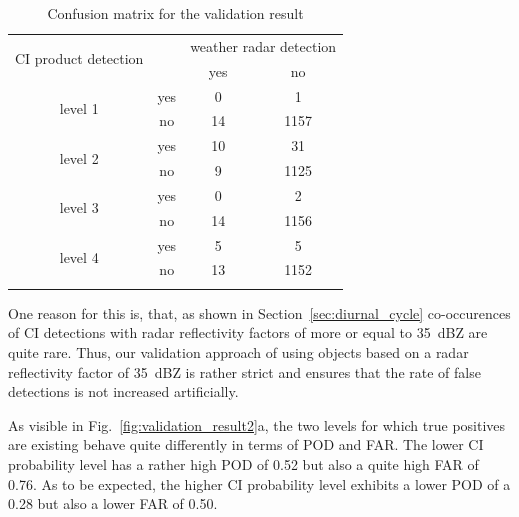 \begin{table}[htb]
\centering
\caption{Confusion matrix for the validation result}
\begin{tabular}{cccc} 
\toprule
\multirow{2}{*}{CI product detection} &     & \multicolumn{2}{c}{weather radar detection} \\
							   						  \cmidrule{3-4}
									  &     &  yes & no \\
\midrule
\multirow{2}{*}{level 1}  & yes &    0 &    1 \\
	                                  & no  &   14 & 1157 \\ 
\midrule
\multirow{2}{*}{level 2}  & yes &   10 &   31 \\ 
	                                  & no  &    9 & 1125 \\ 
\midrule	                                  
\multirow{2}{*}{level 3}  & yes &    0 &    2 \\ 
	                                  & no  &   14 & 1156 \\ 
\midrule	                                  
\multirow{2}{*}{level 4}  & yes &    5 &    5 \\ 
	                                  & no  &   13 & 1152 \\
\addlinespace
\bottomrule
\end{tabular}
\label{tab:validation_result}
\end{table}

One reason for this is, that, as shown in Section~\ref{sec:diurnal_cycle} co-occurences of CI detections with radar reflectivity factors of more or equal to \SI{35}{dBZ} are quite rare. Thus, our validation approach of using objects based on a radar reflectivity factor of \SI{35}{dBZ} is rather strict and ensures that the rate of false detections is not increased artificially.

As visible in Fig.~\ref{fig:validation_result2}a, the two levels for which true positives are existing behave quite differently in terms of POD and FAR. The lower CI probability level has a rather high POD of \num{0.52} but also a quite high FAR of \num{0.76}. As to be expected, the higher CI probability level exhibits a lower POD of a  \num{0.28} but also a lower FAR of 0.50.

